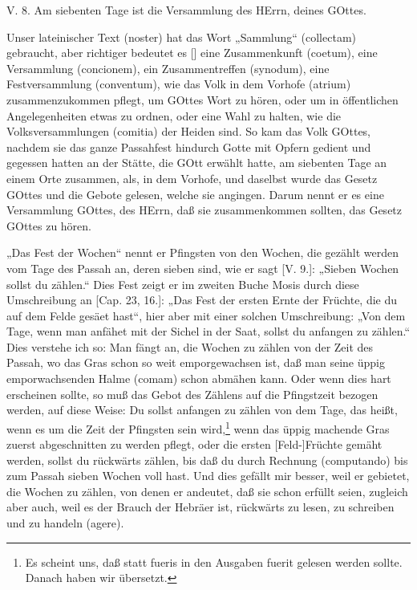 \begin{schriftzitat}
V. 8. Am siebenten Tage ist die Versammlung des HErrn, deines GOttes.
\end{schriftzitat}

Unser lateinischer Text (noster) hat das Wort „Sammlung“ (collectam) gebraucht, aber richtiger bedeutet es [] eine Zusammenkunft (coetum), eine Versammlung (concionem), ein Zusammentreffen (synodum), eine Festversammlung (conventum), wie das Volk in dem Vorhofe (atrium) zusammenzukommen pflegt, um GOttes Wort zu hören, oder um in öffentlichen Angelegenheiten etwas zu ordnen, oder eine Wahl zu halten, wie die Volksversammlungen (comitia) der Heiden sind. So kam das Volk GOttes, nachdem sie das ganze Passahfest hindurch Gotte mit Opfern gedient und gegessen hatten an der Stätte, die GOtt erwählt hatte, am siebenten Tage an einem Orte zusammen, als, in dem Vorhofe, und daselbst wurde das Gesetz GOttes und die Gebote gelesen, welche sie angingen. Darum nennt er es eine Versammlung GOttes, des HErrn, daß sie zusammenkommen sollten, das Gesetz GOttes zu hören.

„Das Fest der Wochen“ nennt er Pfingsten von den Wochen, die gezählt werden vom Tage des Passah an, deren sieben sind, wie er sagt [V. 9.]: „Sieben Wochen sollst du zählen.“ Dies Fest zeigt er im zweiten Buche Mosis durch diese Umschreibung an [Cap. 23, 16.]: „Das Fest der ersten Ernte der Früchte, die du auf dem Felde gesäet hast“, hier aber mit einer solchen Umschreibung: „Von dem Tage, wenn man anfähet mit der Sichel in der Saat, sollst du anfangen zu zählen.“ Dies verstehe ich so: Man fängt an, die Wochen zu zählen von der Zeit des Passah, wo das Gras schon so weit emporgewachsen ist, daß man seine üppig emporwachsenden Halme (comam) schon abmähen kann. Oder wenn dies hart erscheinen sollte, so muß das Gebot des Zählens auf die Pfingstzeit bezogen werden, auf diese Weise: Du sollst anfangen zu zählen von dem Tage, das heißt, wenn es um die Zeit der Pfingsten sein wird,\footnote{Es scheint uns, daß statt fueris in den Ausgaben fuerit gelesen werden sollte. Danach haben wir übersetzt.} wenn das üppig machende Gras zuerst abgeschnitten zu werden pflegt, oder die ersten [Feld-]Früchte gemäht werden, sollst du rückwärts zählen, bis daß du durch Rechnung (computando) bis zum Passah sieben Wochen voll hast. Und dies gefällt mir besser, weil er gebietet, die Wochen zu zählen, von denen er andeutet, daß sie schon erfüllt seien, zugleich aber auch, weil es der Brauch der Hebräer ist, rückwärts zu lesen, zu schreiben und zu handeln (agere).

